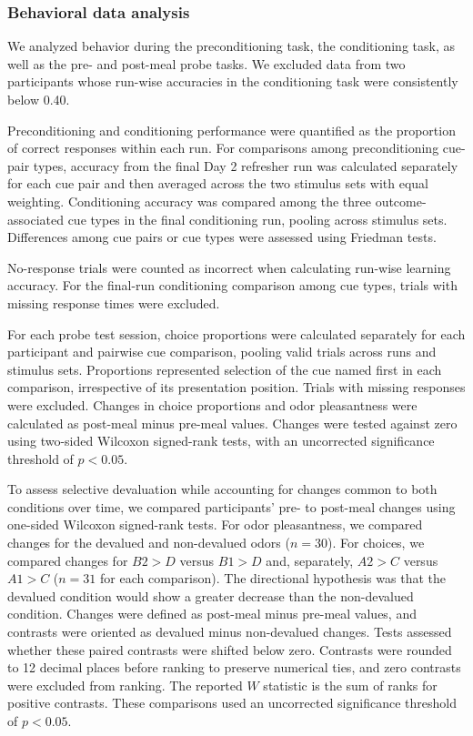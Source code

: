 \documentclass[9pt,twoside,lineno]{pnas-new}
\begin{document}
\subsubsection*{Behavioral data analysis}

We analyzed behavior during the preconditioning task, the conditioning task, as well as the pre- and post-meal probe tasks. We excluded data from two participants whose run-wise accuracies in the conditioning task were consistently below 0.40.

Preconditioning and conditioning performance were quantified as the proportion of correct responses within each run. For comparisons among preconditioning cue-pair types, accuracy from the final Day 2 refresher run was calculated separately for each cue pair and then averaged across the two stimulus sets with equal weighting. Conditioning accuracy was compared among the three outcome-associated cue types in the final conditioning run, pooling across stimulus sets. Differences among cue pairs or cue types were assessed using Friedman tests.

No-response trials were counted as incorrect when calculating run-wise learning accuracy. For the final-run conditioning comparison among cue types, trials with missing response times were excluded.

For each probe test session, choice proportions were calculated separately for each participant and pairwise cue comparison, pooling valid trials across runs and stimulus sets. Proportions represented selection of the cue named first in each comparison, irrespective of its presentation position. Trials with missing responses were excluded. Changes in choice proportions and odor pleasantness were calculated as post-meal minus pre-meal values. Changes were tested against zero using two-sided Wilcoxon signed-rank tests, with an uncorrected significance threshold of $p < 0.05$.

To assess selective devaluation while accounting for changes common to both conditions over time, we compared participants' pre- to post-meal changes using one-sided Wilcoxon signed-rank tests. For odor pleasantness, we compared changes for the devalued and non-devalued odors ($n = 30$). For choices, we compared changes for $B2>D$ versus $B1>D$ and, separately, $A2>C$ versus $A1>C$ ($n = 31$ for each comparison). The directional hypothesis was that the devalued condition would show a greater decrease than the non-devalued condition. Changes were defined as post-meal minus pre-meal values, and contrasts were oriented as devalued minus non-devalued changes. Tests assessed whether these paired contrasts were shifted below zero. Contrasts were rounded to 12 decimal places before ranking to preserve numerical ties, and zero contrasts were excluded from ranking. The reported $W$ statistic is the sum of ranks for positive contrasts. These comparisons used an uncorrected significance threshold of $p < 0.05$.
\end{document}
